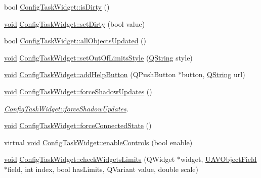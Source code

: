 \begin{DoxyCompactItemize}
bool \hyperlink{group___u_a_v_object_widget_utils_ga2d7e19cef57df7b30741b4901b5a190f}{\-Config\-Task\-Widget\-::is\-Dirty} ()
\item 
\hyperlink{group___u_a_v_objects_plugin_ga444cf2ff3f0ecbe028adce838d373f5c}{void} \hyperlink{group___u_a_v_object_widget_utils_gae75127fbfffe10458defc31a6a18c0f8}{\-Config\-Task\-Widget\-::set\-Dirty} (bool value)
\item 
bool \hyperlink{group___u_a_v_object_widget_utils_ga62e7277f3b8228d44da13a2355b96e9a}{\-Config\-Task\-Widget\-::all\-Objects\-Updated} ()
\item 
\hyperlink{group___u_a_v_objects_plugin_ga444cf2ff3f0ecbe028adce838d373f5c}{void} \hyperlink{group___u_a_v_object_widget_utils_gaefefd74c41c3c7655ae047ae80d6dba8}{\-Config\-Task\-Widget\-::set\-Out\-Of\-Limits\-Style} (\hyperlink{group___u_a_v_objects_plugin_gab9d252f49c333c94a72f97ce3105a32d}{\-Q\-String} style)
\item 
\hyperlink{group___u_a_v_objects_plugin_ga444cf2ff3f0ecbe028adce838d373f5c}{void} \hyperlink{group___u_a_v_object_widget_utils_ga369a4d9a6a1eba7ba8e61e64f1d89b80}{\-Config\-Task\-Widget\-::add\-Help\-Button} (\-Q\-Push\-Button $\ast$button, \hyperlink{group___u_a_v_objects_plugin_gab9d252f49c333c94a72f97ce3105a32d}{\-Q\-String} url)
\item 
\hyperlink{group___u_a_v_objects_plugin_ga444cf2ff3f0ecbe028adce838d373f5c}{void} \hyperlink{group___u_a_v_object_widget_utils_gaae2888fd71dce34ad0c33aed78952e23}{\-Config\-Task\-Widget\-::force\-Shadow\-Updates} ()
\begin{DoxyCompactList}\small\item\em \hyperlink{group___u_a_v_object_widget_utils_gaae2888fd71dce34ad0c33aed78952e23}{\-Config\-Task\-Widget\-::force\-Shadow\-Updates}. \end{DoxyCompactList}\item 
\hyperlink{group___u_a_v_objects_plugin_ga444cf2ff3f0ecbe028adce838d373f5c}{void} \hyperlink{group___u_a_v_object_widget_utils_gaef1ebd891852a741315a8b69975876e6}{\-Config\-Task\-Widget\-::force\-Connected\-State} ()
\item 
virtual \hyperlink{group___u_a_v_objects_plugin_ga444cf2ff3f0ecbe028adce838d373f5c}{void} \hyperlink{group___u_a_v_object_widget_utils_gaad59e4e96d1e4a59067aa44828ddaa3f}{\-Config\-Task\-Widget\-::enable\-Controls} (bool enable)
\item 
\hyperlink{group___u_a_v_objects_plugin_ga444cf2ff3f0ecbe028adce838d373f5c}{void} \hyperlink{group___u_a_v_object_widget_utils_ga087b6f8f17317793efa0d121fe42336a}{\-Config\-Task\-Widget\-::check\-Widgets\-Limits} (\-Q\-Widget $\ast$widget, \hyperlink{class_u_a_v_object_field}{\-U\-A\-V\-Object\-Field} $\ast$field, int index, bool has\-Limits, \-Q\-Variant value, double scale)

\end{DoxyCompactItemize}
